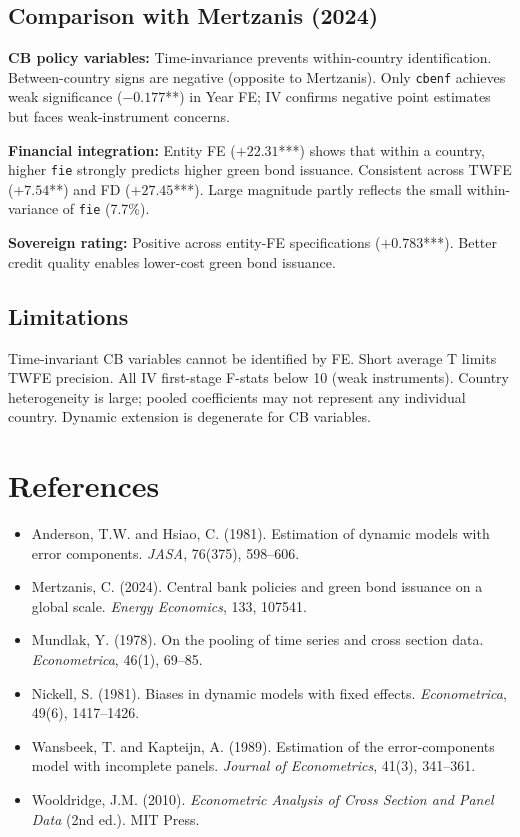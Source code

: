 \documentclass[12pt,a4paper]{article}
\begin{document}
\subsection{Comparison with Mertzanis (2024)}

\textbf{CB policy variables:} Time-invariance prevents within-country
identification. Between-country signs are negative (opposite to Mertzanis).
Only \texttt{cbenf} achieves weak significance ($-0.177$**) in Year FE; IV
confirms negative point estimates but faces weak-instrument concerns.

\textbf{Financial integration:} Entity FE ($+22.31$***) shows that within
a country, higher \texttt{fie} strongly predicts higher green bond issuance.
Consistent across TWFE ($+7.54$**) and FD ($+27.45$***). Large magnitude
partly reflects the small within-variance of \texttt{fie} (7.7\%).

\textbf{Sovereign rating:} Positive across entity-FE specifications
($+0.783$***). Better credit quality enables lower-cost green bond issuance.

\subsection{Limitations}

Time-invariant CB variables cannot be identified by FE. Short average T
limits TWFE precision. All IV first-stage F-stats below 10 (weak instruments).
Country heterogeneity is large; pooled coefficients may not represent any
individual country. Dynamic extension is degenerate for CB variables.

\section{References}

\begin{itemize}
\item Anderson, T.W. and Hsiao, C. (1981). Estimation of dynamic models with
  error components. \textit{JASA}, 76(375), 598--606.
\item Mertzanis, C. (2024). Central bank policies and green bond issuance
  on a global scale. \textit{Energy Economics}, 133, 107541.
\item Mundlak, Y. (1978). On the pooling of time series and cross section
  data. \textit{Econometrica}, 46(1), 69--85.
\item Nickell, S. (1981). Biases in dynamic models with fixed effects.
  \textit{Econometrica}, 49(6), 1417--1426.
\item Wansbeek, T. and Kapteijn, A. (1989). Estimation of the
  error-components model with incomplete panels.
  \textit{Journal of Econometrics}, 41(3), 341--361.
\item Wooldridge, J.M. (2010). \textit{Econometric Analysis of Cross Section
  and Panel Data} (2nd ed.). MIT Press.
\end{itemize}
\end{document}
